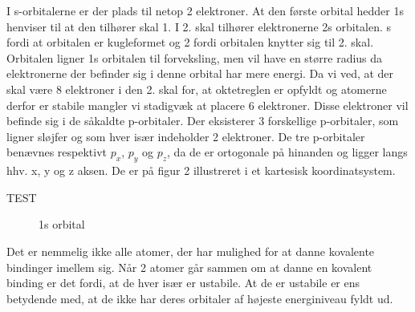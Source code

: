 \documentclass[12pt,a4paper]{article}
\theoremstyle{break}
\theoremstyle{nonumberplain}
\begin{document}
  I s-orbitalerne er der plads til netop 2 elektroner. At den første orbital hedder 1s henviser til at den tilhører skal 1. I 2. skal tilhører elektronerne 2s orbitalen. s fordi at orbitalen er kugleformet og 2 fordi orbitalen knytter sig til 2. skal. Orbitalen ligner 1s orbitalen til forveksling, men vil have en større radius da elektronerne der befinder sig i denne orbital har mere energi. Da vi ved, at der skal være 8 elektroner i den 2. skal for, at oktetreglen er opfyldt og atomerne derfor er stabile mangler vi stadigvæk at placere 6 elektroner. Disse elektroner vil befinde sig i de såkaldte p-orbitaler. Der eksisterer 3 forskellige p-orbitaler, som ligner sløjfer og som hver især indeholder 2 elektroner. De tre p-orbitaler benævnes respektivt $p_x$, $p_y$ og $p_z$, da de er ortogonale på hinanden og ligger langs hhv. x, y og z aksen. De er på figur 2 illustreret i et kartesisk koordinatsystem.
  
TEST
 
\begin{figure}[ht!]
  \centering
  \caption{1s orbital} \end{figure}


Det er nemmelig ikke alle atomer, der har mulighed for at danne kovalente bindinger imellem sig. Når 2 atomer går sammen om at danne en kovalent binding er det fordi, at de hver især er ustabile. At de er ustabile er ens betydende med, at de ikke har deres orbitaler af højeste energiniveau fyldt ud. 
\end{document}
